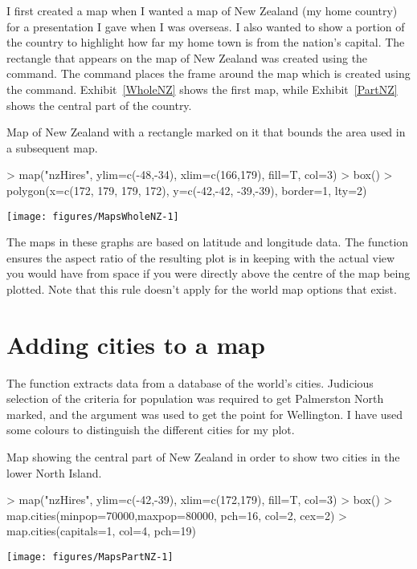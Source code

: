 I first created a map when I wanted a map of New Zealand (my home country) for a presentation I gave when I was overseas. I also wanted to show a portion of the country to highlight how far my home town is from the nation's capital. The rectangle that appears on the map of New Zealand was created using the  command. The  command places the frame around the map which is created using the  command. Exhibit~\ref{WholeNZ} shows the first map, while Exhibit~\ref{PartNZ} shows the central part of the country. 
\begin{exhibit} 
\caption{Map of New Zealand with a rectangle marked on it that bounds the area used in a subsequent map.} 
\label{WholeNZ} 
\begin{center} 
\begin{Schunk}
\begin{Sinput}
> map("nzHires", ylim=c(-48,-34), xlim=c(166,179), fill=T, col=3) 
> box() 
> polygon(x=c(172, 179, 179, 172), y=c(-42,-42, -39,-39), border=1, lty=2) 
\end{Sinput}

\texttt{[image: figures/MapsWholeNZ-1]} \end{Schunk}
\end{center} 
\end{exhibit} 
 
The maps in these graphs are based on latitude and longitude data. The  function ensures the aspect ratio of the resulting plot is in keeping with the actual view you would have from space if you were directly above the centre of the map being plotted. Note that this rule doesn't apply for the world map options that exist. 
 
\section{Adding cities to a map} 
 
The  function extracts data from a database of the world's cities. Judicious selection of the criteria for population was required to get Palmerston North marked, and the  argument was used to get the point for Wellington. I have used some colours to distinguish the different cities for my plot. 
 
\begin{exhibit} 
\caption{Map showing the central part of New Zealand in order to show two cities in the lower North Island.} 
\label{PartNZ} 
\begin{center} 
\begin{Schunk}
\begin{Sinput}
> map("nzHires", ylim=c(-42,-39), xlim=c(172,179), fill=T, col=3) 
> box() 
> map.cities(minpop=70000,maxpop=80000, pch=16, col=2, cex=2) 
> map.cities(capitals=1, col=4, pch=19) 
\end{Sinput}

\texttt{[image: figures/MapsPartNZ-1]} \end{Schunk}
\end{center} 
\end{exhibit} 
 
